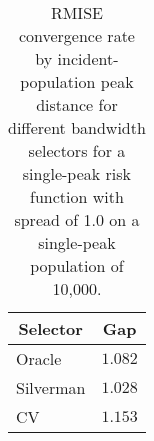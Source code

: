 \begin{table}[htbp]
\begin{center}
\begin{tabular}{lr}
\toprule
\multicolumn{1}{c}{Selector}&\multicolumn{1}{c}{Gap}\tabularnewline
\midrule
Oracle&$1.082$\tabularnewline
Silverman&$1.028$\tabularnewline
CV&$1.153$\tabularnewline
\bottomrule
\end{tabular}
\caption[RMISE Convergence rate by incident-population peak distance]{RMISE convergence rate by incident-population peak distance for different bandwidth selectors for a single-peak risk function with spread of 1.0 on a single-peak population of 10,000.\label{tab:results:rmise_convergence_by_pop_incident_gap}}\end{center}
\end{table}
